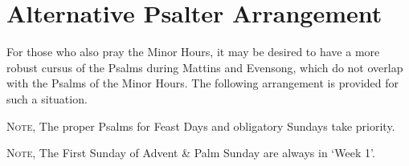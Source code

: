 \fancyhead[RE,LO]{}
\section*{Alternative Psalter Arrangement}
\begin{secrubric}
	For those who also pray the Minor Hours, it may be desired to have a more robust cursus of the Psalms during Mattins and Evensong, which do not overlap with the Psalms of the Minor Hours. The following arrangement is provided for such a situation.
\end{secrubric}
\begin{rubric}
		\textsc{Note,} The proper Psalms for Feast Days and obligatory Sundays take priority.
\end{rubric}
\begin{rubric}
	\textsc{Note,} The First Sunday of Advent \& Palm Sunday are always in `Week 1'.
\end{rubric}

